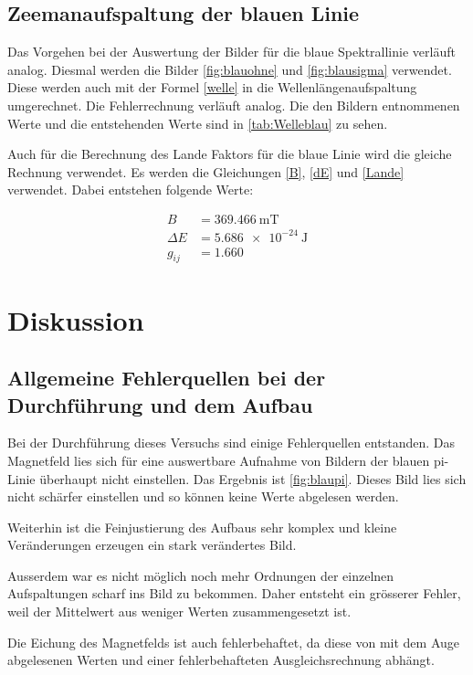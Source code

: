 \subsection{Zeemanaufspaltung der blauen Linie}

Das Vorgehen bei der Auswertung der Bilder für die blaue Spektrallinie verläuft analog. Diesmal werden die Bilder \ref{fig:blauohne} und \ref{fig:blausigma} verwendet. Diese werden auch mit der Formel \ref{welle} in die Wellenlängenaufspaltung umgerechnet. Die Fehlerrechnung verläuft analog. Die den Bildern entnommenen Werte und die entstehenden Werte sind in \ref{tab:Welleblau} zu sehen.

\noindent Auch für die Berechnung des Lande Faktors für die blaue Linie wird die gleiche Rechnung verwendet. Es werden die Gleichungen \ref{B}, \ref{dE} und \ref{Lande} verwendet. Dabei entstehen folgende Werte:

\begin{align*}
    B &= \SI{369.466}{\milli\tesla} \\
    \Delta E &= \SI{5.686e-24}{\joule} \\
    g_{ij} &= 1.660 
\end{align*}

\section{Diskussion}

\subsection{Allgemeine Fehlerquellen bei der Durchführung und dem Aufbau}

Bei der Durchführung dieses Versuchs sind einige Fehlerquellen entstanden. Das Magnetfeld lies sich für eine auswertbare Aufnahme von Bildern der blauen pi-Linie überhaupt nicht einstellen. Das Ergebnis ist \ref{fig:blaupi}. Dieses Bild lies sich nicht schärfer einstellen und so können keine Werte abgelesen werden. 

\noindent Weiterhin ist die Feinjustierung des Aufbaus sehr komplex und kleine Veränderungen erzeugen ein stark verändertes Bild. 

\noindent Ausserdem war es nicht möglich noch mehr Ordnungen der einzelnen Aufspaltungen scharf ins Bild zu bekommen. Daher entsteht ein grösserer Fehler, weil der Mittelwert aus weniger Werten zusammengesetzt ist. 

\noindent Die Eichung des Magnetfelds ist auch fehlerbehaftet, da diese von mit dem Auge abgelesenen Werten und einer fehlerbehafteten Ausgleichsrechnung abhängt.

